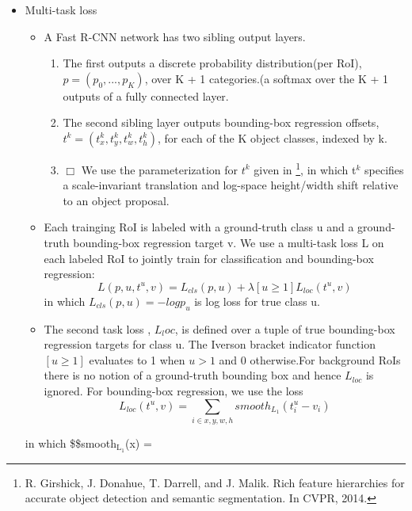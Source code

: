 \documentclass[11pt]{article}
\begin{document}
\begin{itemize}

\item Multi-task loss\\
\label{sec-1-1-3-1}%
\begin{itemize}
\item A Fast R-CNN network has two sibling output layers.
\begin{enumerate}
\item The first outputs a discrete probability distribution(per RoI), 
          $p = (p_0, ..., p_K)$, over K + 1 categories.(a softmax over the K + 1 outputs of a
          fully connected layer.
\item The second sibling layer outputs bounding-box regression offsets, 
          $t^k = (t_x^k, t_y^k, t_w^k, t_h^k)$, for each of the K object classes, indexed by k.
\item $\Box$ We use the parameterization for $t^k$ given in \footnote{R. Girshick, J. Donahue, T. Darrell, and J. Malik.  
  Rich feature hierarchies for accurate object detection and semantic segmentation. In CVPR, 2014.
 }, in which t$^k$ specifies a
          scale-invariant translation and log-space height/width shift relative to an object 
          proposal.
\end{enumerate}
\item Each trainging RoI is labeled with a ground-truth class u and a ground-truth bounding-box
       regression target v. We use a multi-task loss L on each labeled RoI to jointly train for
       classification and bounding-box regression:
       \begin{equation}
       L(p, u, t^u, v) = L_{cls}(p, u) + \lambda[u\ge1]L_{loc}(t^u, v)         
       \end{equation}
       in which $L_{cls}(p, u)  = -logp_u$ is log loss for true class u.
\item The second task loss , $L_loc$, is defined over a tuple of true bounding-box regression 
       targets for class u. The Iverson bracket indicator function $[u\ge1]$ evaluates to 1 when 
       $u>1$ and 0 otherwise.For background RoIs there is no notion of a ground-truth bounding box
       and hence $L_{loc}$ is ignored. For bounding-box regression, we use the loss
       \begin{equation}
         L_{loc}(t^u, v) = \sum_{i\in{x, y, w, h}} smooth_{L_1}(t_i^u - v_i)         
       \end{equation}
\end{itemize}
       

       in which 
       \$\$smooth$_{\mathrm{L_1}}$(x) = 


       

\end{itemize} %
\end{document}
